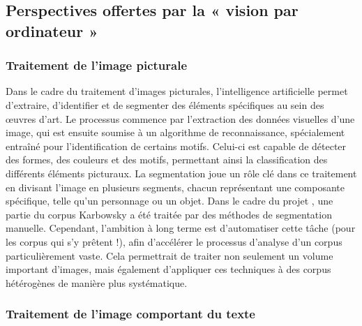 \subsection{Perspectives offertes par la « vision par ordinateur »}

\subsubsection{Traitement de l’image picturale}

Dans le cadre du traitement d’images picturales, l'intelligence artificielle permet d'extraire, d'identifier et de segmenter des éléments spécifiques au sein des œuvres d'art. Le processus commence par l'extraction des données visuelles d'une image, qui est ensuite soumise à un algorithme de reconnaissance, spécialement entraîné pour l’identification de certains motifs. Celui-ci est capable de détecter des formes, des couleurs et des motifs, permettant ainsi la classification des différents éléments picturaux. La segmentation joue un rôle clé dans ce traitement en divisant l’image en plusieurs segments, chacun représentant une composante spécifique, telle qu’un personnage ou un objet. 
Dans le cadre du projet \pense, une partie du corpus Karbowsky a été traitée par des méthodes de segmentation manuelle. Cependant, l’ambition à long terme est d’automatiser cette tâche (pour les corpus qui s’y prêtent !), afin d’accélérer le processus d’analyse d’un corpus particulièrement vaste. Cela permettrait de traiter non seulement un volume important d'images, mais également d’appliquer ces techniques à des corpus hétérogènes de manière plus systématique.

\subsubsection{Traitement de l’image comportant du texte}

